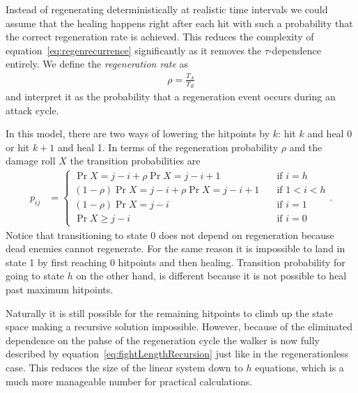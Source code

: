 Instead of regenerating deterministically at realistic time intervals we could assume that the healing happens right after each hit with such a probability that the correct regeneration rate is achieved. This reduces the complexity of equation~\ref{eq:regenrecurrence} significantly as it removes the $\tau$-dependence entirely. We define the \emph{regeneration rate} as
\begin{align}\label{eq:regenProbability}
    \rho = \frac{T_A}{T_R}
\end{align}
and interpret it as the probability that a regeneration event occurs during an attack cycle.

In this model, there are two ways of lowering the hitpoints by $k$: hit $k$ and heal 0 or hit $k+1$ and heal 1. In terms of the regeneration probability $\rho$ and the damage roll $X$ the transition probabilities are
\begin{align}
    p_{ij}
         &= \begin{cases}
			 \Pr{X = j-i} + \rho \Pr{X = j-i+1} \quad &\mbox{if } i = h \\
            (1-\rho)\Pr{X = j-i} + \rho \Pr{X = j-i+1} \quad &\mbox{if } 1 < i < h \\
            (1-\rho)\Pr{X = j-i} \quad &\mbox{if } i = 1 \\
            \Pr{X \geq j-i} \quad &\mbox{if } i = 0
        \end{cases}\label{eq:damageDistributionRegen}.
\end{align}
Notice that transitioning to state 0 does not depend on regeneration because dead enemies cannot regenerate. For the same reason it is impossible to land in state 1 by first reaching 0 hitpoints and then healing. Transition probability for going to state $h$ on the other hand, is different because it is not possible to heal past maximum hitpoints.

Naturally it is still possible for the remaining hitpoints to climb up the state space making a recursive solution impossible. However, because of the eliminated dependence on the pahse of the regeneration cycle the walker is now fully described by equation~\ref{eq:fightLengthRecursion} just like in the regenerationless case. This reduces the size of the linear system down to $h$ equations, which is a much more manageable number for practical calculations.
